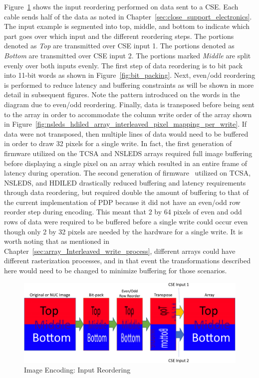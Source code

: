     Figure~\ref{fig:image_encoding} shows the input reordering performed on data sent to a CSE. Each cable sends half of the data as noted in Chapter~\ref{sec:close_support_electronics}. The input example is segmented into top, middle, and bottom to indicate which part goes over which input and the different reordering steps. The portions denoted as {\it Top} are transmitted over CSE input 1. The portions denoted as {\it Bottom} are transmitted over CSE input 2. The portions marked {\it Middle} are split evenly over both inputs evenly. The first step of data reordering is to bit pack into 11-bit words as shown in Figure~\ref{fig:bit_packing}. Next, even/odd reordering is performed to reduce latency and buffering constraints as will be shown in more detail in subsequent figures. Note the pattern introduced on the words in the diagram due to even/odd reordering. Finally, data is transposed before being sent to the array in order to accommodate the column write order of the array shown in Figure~\ref{fig:nsleds_hdiled_array_interleaved_pixel_mapping_per_write}. If data were not transposed, then multiple lines of data would need to be buffered in order to draw 32 pixels for a single write. In fact, the first generation of firmware utilized on the TCSA and NSLEDS arrays required full image buffering before displaying a single pixel on an array which resulted in an entire frame of latency during operation. The second generation of firmware~\cite{HouserEtAl2018} utilized on TCSA, NSLEDS, and HDILED drastically reduced buffering and latency requirements through data reordering, but
    required double the amount of buffering to that of the current implementation of PDP because it did not have an even/odd row reorder step during encoding. This meant that 2 by 64 pixels of even and odd rows of data were required to be buffered before a single write could occur even though only 2 by 32 pixels are needed by the hardware for a single write. It is worth noting that as mentioned in Chapter~\ref{sec:array_Interleaved_write_process}, different arrays could have different rasterization processes, and in that event the transformations described here would need to be changed to minimize buffering for those scenarios.

    \begin{figure}
        \centering
        \includegraphics[width=1.0\textwidth]{fig/image_encoding.pdf}
        \caption{Image Encoding: Input Reordering}
        \label{fig:image_encoding}
    \end{figure}

